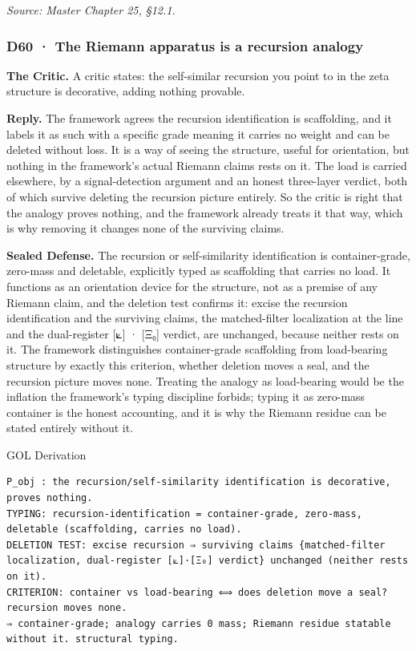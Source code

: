 \documentclass[10pt,twocolumn]{article}
\begin{document}
\emph{Source: Master Chapter 25, §12.1.}

\hypertarget{d60-the-riemann-apparatus-is-a-recursion-analogy}{%
\subsubsection{D60 · The Riemann apparatus is a recursion
analogy}\label{d60-the-riemann-apparatus-is-a-recursion-analogy}}

\textbf{The Critic.} A critic states: the self-similar recursion you
point to in the zeta structure is decorative, adding nothing provable.

\textbf{Reply.} The framework agrees the recursion identification is
scaffolding, and it labels it as such with a specific grade meaning it
carries no weight and can be deleted without loss. It is a way of seeing
the structure, useful for orientation, but nothing in the framework's
actual Riemann claims rests on it. The load is carried elsewhere, by a
signal-detection argument and an honest three-layer verdict, both of
which survive deleting the recursion picture entirely. So the critic is
right that the analogy proves nothing, and the framework already treats
it that way, which is why removing it changes none of the surviving
claims.

\textbf{Sealed Defense.} The recursion or self-similarity identification
is container-grade, zero-mass and deletable, explicitly typed as
scaffolding that carries no load. It functions as an orientation device
for the structure, not as a premise of any Riemann claim, and the
deletion test confirms it: excise the recursion identification and the
surviving claims, the matched-filter localization at the line and the
dual-register {[}⟀{]} · {[}Ξ₀{]} verdict, are unchanged, because neither
rests on it. The framework distinguishes container-grade scaffolding
from load-bearing structure by exactly this criterion, whether deletion
moves a seal, and the recursion picture moves none. Treating the analogy
as load-bearing would be the inflation the framework's typing discipline
forbids; typing it as zero-mass container is the honest accounting, and
it is why the Riemann residue can be stated entirely without it.

\begin{golbox}{GOL Derivation}
\begin{lstlisting}[style=golv]
P_obj : the recursion/self-similarity identification is decorative, proves nothing.
TYPING: recursion-identification = container-grade, zero-mass, deletable (scaffolding, carries no load).
DELETION TEST: excise recursion ⇒ surviving claims {matched-filter localization, dual-register [⟀]·[Ξ₀] verdict} unchanged (neither rests on it).
CRITERION: container vs load-bearing ⟺ does deletion move a seal? recursion moves none.
⇒ container-grade; analogy carries 0 mass; Riemann residue statable without it. structural typing.
\end{lstlisting}
\end{golbox}
\end{document}
